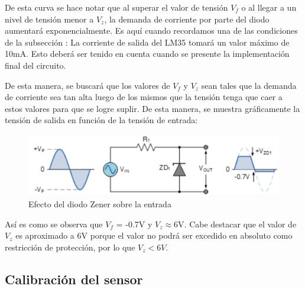 \documentclass[../../main.tex]{subfiles}
\begin{document}
De esta curva se hace notar que al superar el valor de tensión $V_f$ o al llegar a un nivel de tensión menor a $V_z$, la demanda de corriente por parte del diodo aumentará exponencialmente. Es aquí cuando recordamos una de las condiciones de la subsección : La corriente de salida del LM35 tomará un valor máximo de 10mA. Esto deberá ser tenido en cuenta cuando se presente la implementación final del circuito. \par
De esta manera, se buscará que los valores de $V_f$ y $V_z$ sean tales que la demanda de corriente sea tan alta luego de los mismos que la tensión tenga que caer a estos valores para que se logre suplir. De esta manera, se muestra gráficamente la tensión de salida en función de la tensión de entrada:

\begin{figure}[H]	%
	\centering
	\includegraphics[scale=0.5]{imagenes/zener_diode_efecto.png}
	\caption{Efecto del diodo Zener sobre la entrada}
	\label{fig:ej6_zener_diode_efecto}
\end{figure}

Así es como se observa que $V_f$ = -0.7V y $V_z$$\approx$6V. Cabe destacar que el valor de $V_z$ es aproximado a 6V porque el valor no podrá ser excedido en absoluto como restricción de protección, por lo que $V_z<6V$.

\subsection{Calibración del sensor}
\end{document}
